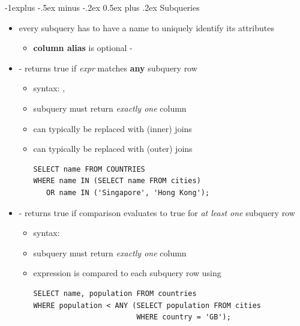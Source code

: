 \documentclass[10pt, landscape]{article}
\makeatletter
\renewcommand{\subsection}{\@startsection{subsection}{2}{0mm}%
  {-1explus -.5ex minus -.2ex}%
  {0.5ex plus .2ex}%
{\normalfont\normalsize\bfseries}}
\makeatother
\begin{document}
\begin{multicols}{3}
  \subsection{Subqueries}
  \begin{itemize}
    \item {} every subquery has to have a name to uniquely identify its attributes
      \begin{itemize}
        \item \textbf{column alias} is optional - 
      \end{itemize}

    \item {} - returns true if \textit{expr} matches \textbf{any} subquery row
      \begin{itemize}
        \item syntax: , 
        \item subquery must return \textit{exactly one} column
        \item {} can typically be replaced with (inner) joins
        \item {} can typically be replaced with (outer) joins
          \begin{lstlisting}[style=mySQL]
SELECT name FROM COUNTRIES
WHERE name IN (SELECT name FROM cities)
   OR name IN ('Singapore', 'Hong Kong');
          \end{lstlisting}
      \end{itemize}

    \item {} - returns true if comparison evaluates to true for \textit{at least one} subquery row
      \begin{itemize}
        \item syntax: 
        \item subquery must return \textit{exactly one} column
        \item expression is compared to each subquery row using  
          \begin{lstlisting}[style=mySQL]
SELECT name, population FROM countries 
WHERE population < ANY (SELECT population FROM cities
                        WHERE country = 'GB');
          \end{lstlisting}
      \end{itemize}


\end{itemize}
\end{multicols}
\end{document}
